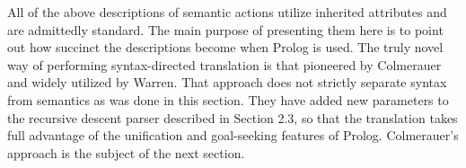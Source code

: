 All of the above descriptions of semantic actions utilize inherited attributes
and are admittedly standard. The main purpose of presenting them here is to
point out how succinct the descriptions become when Prolog is used. The truly
novel way of performing syntax-directed translation is that pioneered by
Colmerauer and widely utilized by Warren. That approach does not strictly
separate syntax from semantics as was done in this section. They have added
new parameters to the recursive descent parser described in Section 2.3, so that
the translation takes full advantage of the unification and goal-seeking features
of Prolog. Colmerauer’s approach is the subject of the next section. 

